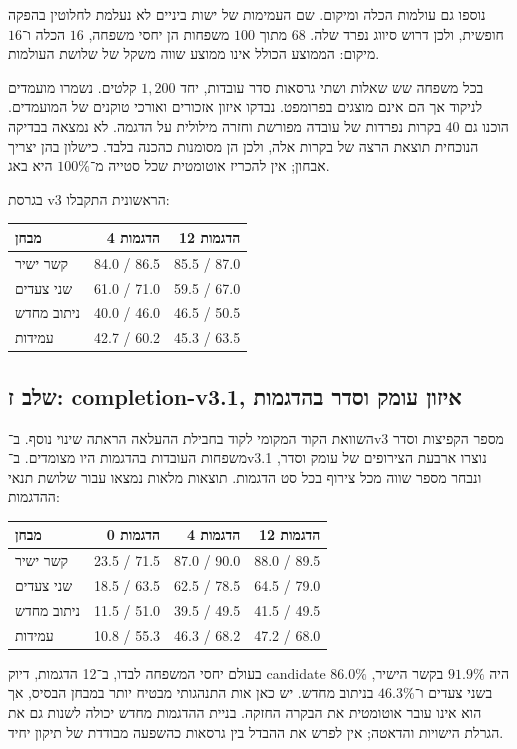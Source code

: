 \documentclass[11pt,a4paper]{article}
\newcommand{\en}[1]{\textenglish{#1}}
\begin{document}
נוספו גם עולמות הכלה ומיקום. שם העמימות של ישות ביניים לא נעלמת לחלוטין בהפקה חופשית, ולכן דרוש סיווג נפרד שלה. $68$ מתוך $100$ משפחות הן יחסי משפחה, $16$ הכלה ו־$16$ מיקום: הממוצע הכולל אינו ממוצע שווה משקל של שלושת העולמות.

בכל משפחה שש שאלות ושתי גרסאות סדר עובדות, יחד $1{,}200$ קלטים. נשמרו מועמדים לניקוד אך הם אינם מוצגים בפרומפט. נבדקו איזון אזכורים ואורכי טוקנים של המועמדים. הוכנו גם $40$ בקרות נפרדות של עובדה מפורשת וחזרה מילולית על הדגמה. לא נמצאה בבדיקה הנוכחית תוצאת הרצה של בקרות אלה, ולכן הן מסומנות כהכנה בלבד. כישלון בהן יצריך אבחון; אין להכריז אוטומטית שכל סטייה מ־$100\%$ היא באג.

בגרסת \en{v3} הראשונית התקבלו:
\begin{center}\small
\begin{tabular}{lrr}
\toprule
מבחן & 4 הדגמות & 12 הדגמות\\\midrule
קשר ישיר & \en{84.0 / 86.5} & \en{85.5 / 87.0}\\
שני צעדים & \en{61.0 / 71.0} & \en{59.5 / 67.0}\\
ניתוב מחדש & \en{40.0 / 46.0} & \en{46.5 / 50.5}\\
עמידות & \en{42.7 / 60.2} & \en{45.3 / 63.5}\\\bottomrule
\end{tabular}
\end{center}

\subsection{שלב ז: completion-v3.1, איזון עומק וסדר בהדגמות}
השוואת הקוד המקומי לקוד בחבילת ההעלאה הראתה שינוי נוסף. ב־\en{v3} מספר הקפיצות וסדר משפחות העובדות בהדגמות היו מצומדים. ב־\en{v3.1} נוצרו ארבעת הצירופים של עומק וסדר, ונבחר מספר שווה מכל צירוף בכל סט הדגמות. תוצאות מלאות נמצאו עבור שלושת תנאי ההדגמות:
\begin{center}\small
\begin{tabular}{lrrr}
\toprule
מבחן & 0 הדגמות & 4 הדגמות & 12 הדגמות\\\midrule
קשר ישיר & \en{23.5 / 71.5} & \en{87.0 / 90.0} & \en{88.0 / 89.5}\\
שני צעדים & \en{18.5 / 63.5} & \en{62.5 / 78.5} & \en{64.5 / 79.0}\\
ניתוב מחדש & \en{11.5 / 51.0} & \en{39.5 / 49.5} & \en{41.5 / 49.5}\\
עמידות & \en{10.8 / 55.3} & \en{46.3 / 68.2} & \en{47.2 / 68.0}\\\bottomrule
\end{tabular}
\end{center}
בעולם יחסי המשפחה לבדו, ב־12 הדגמות, דיוק \en{candidate} היה $91.9\%$ בקשר הישיר, $86.0\%$ בשני צעדים ו־$46.3\%$ בניתוב מחדש. יש כאן אות התנהגותי מבטיח יותר במבחן הבסיס, אך הוא אינו עובר אוטומטית את הבקרה החזקה. בניית ההדגמות מחדש יכולה לשנות גם את הגרלת הישויות והדאטה; אין לפרש את ההבדל בין גרסאות כהשפעה מבודדת של תיקון יחיד.
\end{document}

